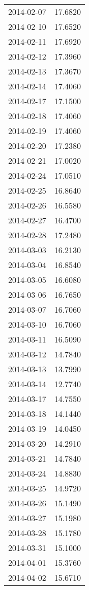 \begin{tabular}{lr}
2014-02-07 &     17.6820 \\
2014-02-10 &     17.6520 \\
2014-02-11 &     17.6920 \\
2014-02-12 &     17.3960 \\
2014-02-13 &     17.3670 \\
2014-02-14 &     17.4060 \\
2014-02-17 &     17.1500 \\
2014-02-18 &     17.4060 \\
2014-02-19 &     17.4060 \\
2014-02-20 &     17.2380 \\
2014-02-21 &     17.0020 \\
2014-02-24 &     17.0510 \\
2014-02-25 &     16.8640 \\
2014-02-26 &     16.5580 \\
2014-02-27 &     16.4700 \\
2014-02-28 &     17.2480 \\
2014-03-03 &     16.2130 \\
2014-03-04 &     16.8540 \\
2014-03-05 &     16.6080 \\
2014-03-06 &     16.7650 \\
2014-03-07 &     16.7060 \\
2014-03-10 &     16.7060 \\
2014-03-11 &     16.5090 \\
2014-03-12 &     14.7840 \\
2014-03-13 &     13.7990 \\
2014-03-14 &     12.7740 \\
2014-03-17 &     14.7550 \\
2014-03-18 &     14.1440 \\
2014-03-19 &     14.0450 \\
2014-03-20 &     14.2910 \\
2014-03-21 &     14.7840 \\
2014-03-24 &     14.8830 \\
2014-03-25 &     14.9720 \\
2014-03-26 &     15.1490 \\
2014-03-27 &     15.1980 \\
2014-03-28 &     15.1780 \\
2014-03-31 &     15.1000 \\
2014-04-01 &     15.3760 \\
2014-04-02 &     15.6710 \\

\end{tabular}
